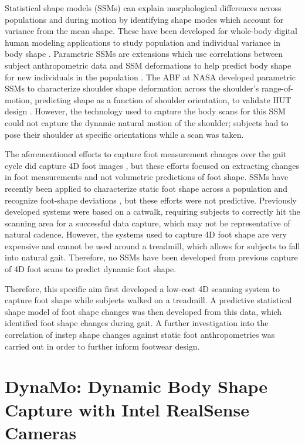 \documentclass[defaultstyle,11pt]{thesis}
\begin{document}
Statistical shape models (SSMs) can explain morphological differences across populations and during motion by identifying shape modes which account for variance from the mean shape.
These have been developed for whole-body digital human modeling applications to study population and individual variance in body shape \citep{Allen2003, Anguelov2005, Reed2014, Park2015a, Park2017}.
Parametric SSMs are extensions which use correlations between subject anthropometric data and SSM deformations to help predict body shape for new individuals in the population \citep{Park2015a, Park2017}.
The ABF at NASA developed parametric SSMs to characterize shoulder shape deformation across the shoulder's range-of-motion, predicting shape as a function of shoulder orientation, to validate HUT design \citep{Kim2016, Kim2019}.
However, the technology used to capture the body scans for this SSM could not capture the dynamic natural motion of the shoulder; subjects had to pose their shoulder at specific orientations while a scan was taken.

The aforementioned efforts to capture foot measurement changes over the gait cycle did capture 4D foot images \citep{Barisch-Fritz2014, Grau2018}, but these efforts focused on extracting changes in foot measurements and not volumetric predictions of foot shape.
SSMs have recently been applied to characterize static foot shape across a population \citep{Conrad2019} and recognize foot-shape deviations \citep{Stankovic2020, Schuster2021}, but these efforts were not predictive.
Previously developed systems were based on a catwalk, requiring subjects to correctly hit the scanning area for a successful data capture, which may not be representative of natural cadence.
However, the systems used to capture 4D foot shape are very expensive and cannot be used around a treadmill, which allows for subjects to fall into natural gait.
Therefore, no SSMs have been developed from previous capture of 4D foot scans to predict dynamic foot shape.

Therefore, this specific aim first developed a low-cost 4D scanning system to capture foot shape while subjects walked on a treadmill.
A predictive statistical shape model of foot shape changes was then developed from this data, which identified foot shape changes during gait.
A further investigation into the correlation of instep shape changes against static foot anthropometries was carried out in order to further inform footwear design.

\hypertarget{dynamo-dynamic-body-shape-capture-with-intel-realsense-cameras}{%
\section{DynaMo: Dynamic Body Shape Capture with Intel RealSense Cameras}\label{dynamo-dynamic-body-shape-capture-with-intel-realsense-cameras}}
\end{document}
